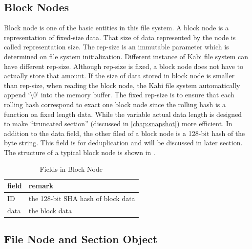 \subsection{Block Nodes}

    Block node is one of the basic entities in this file system. A block node is a representation of fixed-size data. That size of data represented by the node is called representation size. The rep-size is an immutable parameter which is determined on file system initialization. Different instance of Kabi file system can have different rep-size. Although rep-size is fixed, a block node does not have to actually store that amount. If the size of data stored in block node is smaller than rep-size, when reading the block node, the Kabi file system automatically append `\textbackslash0' into the memory buffer. The fixed rep-size is to ensure that each rolling hash correspond to exact one block node since the rolling hash is a function on fixed length data. While the variable actual data length is designed to make ``truncated section'' (discussed in \cref{chap:snapshot}) more efficient. In addition to the data field, the other filed of a block node is a 128-bit hash of the byte string. This field is for deduplication and will be discussed in later section. The structure of a typical block node is shown in .

\begin{table}[t]
\caption{Fields in Block Node}
\label{tab:block_fields}
\begin{center}
\begin{tabular}{ll}
\toprule
field & remark\\
\midrule
ID & the 128-bit SHA hash of block data\\
data & the block data\\
\bottomrule
\end{tabular}
\end{center}
\end{table}

\subsection{File Node and Section Object}

